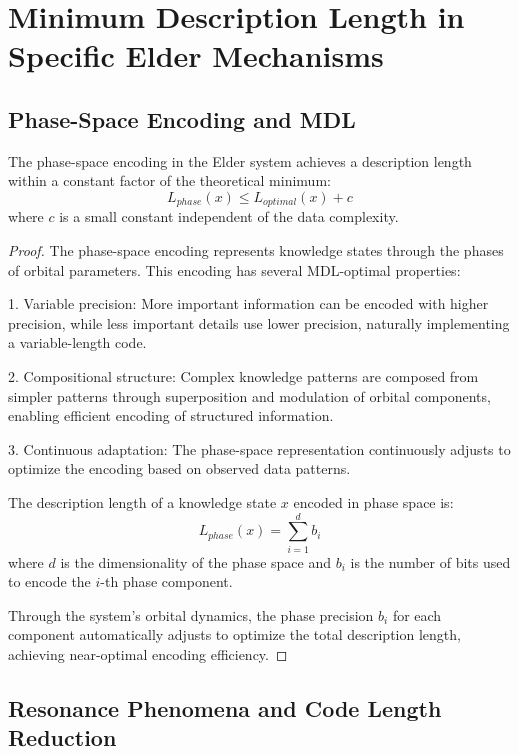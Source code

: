 \section{Minimum Description Length in Specific Elder Mechanisms}

\subsection{Phase-Space Encoding and MDL}

\begin{theorem}
The phase-space encoding in the Elder system achieves a description length within a constant factor of the theoretical minimum:
\begin{equation}
L_{phase}(x) \leq L_{optimal}(x) + c
\end{equation}
where $c$ is a small constant independent of the data complexity.
\end{theorem}

\begin{proof}
The phase-space encoding represents knowledge states through the phases of orbital parameters. This encoding has several MDL-optimal properties:

1. Variable precision: More important information can be encoded with higher precision, while less important details use lower precision, naturally implementing a variable-length code.

2. Compositional structure: Complex knowledge patterns are composed from simpler patterns through superposition and modulation of orbital components, enabling efficient encoding of structured information.

3. Continuous adaptation: The phase-space representation continuously adjusts to optimize the encoding based on observed data patterns.

The description length of a knowledge state $x$ encoded in phase space is:
\begin{equation}
L_{phase}(x) = \sum_{i=1}^d b_i
\end{equation}
where $d$ is the dimensionality of the phase space and $b_i$ is the number of bits used to encode the $i$-th phase component.

Through the system's orbital dynamics, the phase precision $b_i$ for each component automatically adjusts to optimize the total description length, achieving near-optimal encoding efficiency.
\end{proof}

\subsection{Resonance Phenomena and Code Length Reduction}


